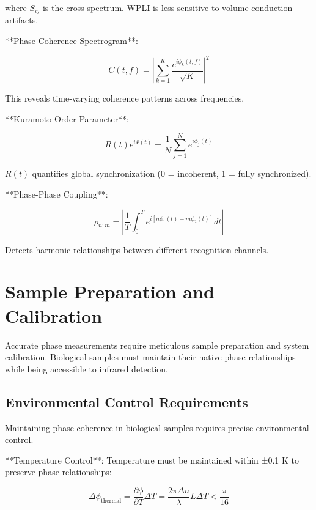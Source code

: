 \documentclass[12pt,a4paper]{report}
\begin{document}
where $S_{ij}$ is the cross-spectrum. WPLI is less sensitive to volume conduction artifacts.

**Phase Coherence Spectrogram**:

\begin{equation}
C(t, f) = \left|\sum_{k=1}^{K} \frac{e^{i\phi_k(t,f)}}{\sqrt{K}}\right|^2
\end{equation}

This reveals time-varying coherence patterns across frequencies.

**Kuramoto Order Parameter**:

\begin{equation}
R(t) e^{i\Psi(t)} = \frac{1}{N} \sum_{j=1}^{N} e^{i\phi_j(t)}
\end{equation}

$R(t)$ quantifies global synchronization (0 = incoherent, 1 = fully synchronized).

**Phase-Phase Coupling**:

\begin{equation}
\rho_{n:m} = \left|\frac{1}{T} \int_0^T e^{i[n\phi_1(t) - m\phi_2(t)]} dt\right|
\end{equation}

Detects harmonic relationships between different recognition channels.

\section{Sample Preparation and Calibration}

Accurate phase measurements require meticulous sample preparation and system calibration. Biological samples must maintain their native phase relationships while being accessible to infrared detection.

\subsection{Environmental Control Requirements}

Maintaining phase coherence in biological samples requires precise environmental control.

**Temperature Control**: Temperature must be maintained within ±0.1 K to preserve phase relationships:

\begin{equation}
\Delta\phi_{\text{thermal}} = \frac{\partial\phi}{\partial T} \Delta T = \frac{2\pi \Delta n}{\lambda} L \Delta T < \frac{\pi}{16}
\end{equation}
\end{document}

